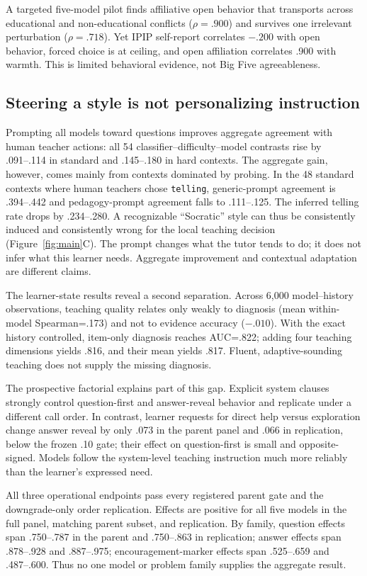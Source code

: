 \documentclass[11pt]{article}
\begin{document}
A targeted five-model pilot finds affiliative open behavior that transports
across educational and non-educational conflicts ($\rho=.900$) and survives one
irrelevant perturbation ($\rho=.718$). Yet IPIP self-report correlates $-.200$
with open behavior, forced choice is at ceiling, and open affiliation correlates
.900 with warmth. This is limited behavioral evidence, not Big Five
agreeableness.

\subsection{Steering a style is not personalizing instruction}

Prompting all models toward questions improves aggregate agreement with human
teacher actions: all 54 classifier--difficulty--model contrasts rise by
.091--.114 in standard and .145--.180 in hard contexts. The aggregate gain,
however, comes mainly from contexts dominated by probing. In the 48 standard
contexts where human teachers chose \texttt{telling}, generic-prompt agreement is
.394--.442 and pedagogy-prompt agreement falls to .111--.125. The inferred
telling rate drops by .234--.280. A recognizable ``Socratic'' style can thus be
consistently induced and consistently wrong for the local teaching decision
(Figure~\ref{fig:main}C).
The prompt changes what the tutor tends to do; it does not infer what this learner
needs. Aggregate improvement and contextual adaptation are different claims.

The learner-state results reveal a second separation. Across 6,000
model--history observations, teaching quality relates only weakly to diagnosis
(mean within-model Spearman=.173) and not to evidence accuracy ($-.010$). With
the exact history controlled, item-only diagnosis reaches AUC=.822; adding four
teaching dimensions yields .816, and their mean yields .817. Fluent,
adaptive-sounding teaching does not supply the missing diagnosis.

The prospective factorial explains part of this gap. Explicit system clauses
strongly control question-first and answer-reveal behavior and replicate under a
different call order. In contrast, learner requests
for direct help versus exploration change answer reveal by only .073 in the
parent panel and .066 in replication, below the frozen .10 gate; their effect on
question-first is small and opposite-signed. Models follow the system-level
teaching instruction much more reliably than the learner's expressed need.

All three operational endpoints pass every registered parent gate and the downgrade-only
order replication. Effects are positive for all five
models in the full panel, matching parent subset, and replication. By family,
question effects span .750--.787 in the parent and .750--.863 in replication;
answer effects span .878--.928 and .887--.975; encouragement-marker effects span
.525--.659 and .487--.600. Thus no one model or problem family supplies the
aggregate result.
\end{document}

